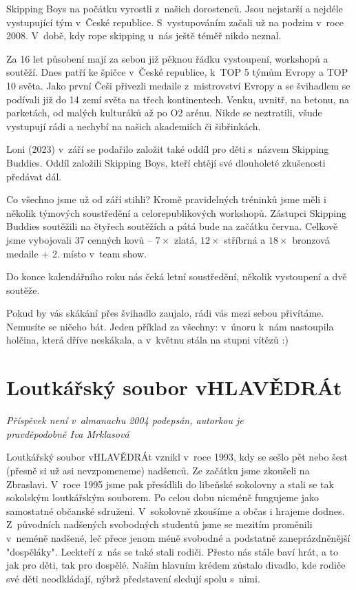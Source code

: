\documentclass[a5paper, 11pt, twoside]{article}
\begin{document}
\noindent
Skipping Boys na počátku vyrostli z~našich dorostenců. Jsou nejstarší a
nejdéle vystupující tým v~České republice. S~vystupováním začali už na
podzim v~roce 2008. V~době, kdy rope skipping u~nás ještě téměř nikdo
neznal.

Za 16 let působení mají za sebou již pěknou řádku vystoupení, workshopů
a soutěží. Dnes patří ke špičce v~České republice, k~TOP 5 týmům Evropy
a TOP 10 světa. Jako první Češi přivezli medaile z~mistrovství Evropy a
se švihadlem se podívali již do 14 zemí světa na třech kontinentech.
Venku, uvnitř, na betonu, na parketách, od malých kulturáků až po O2
arénu. Nikde se neztratili, všude vystupují rádi a nechybí na našich
akademiích či šibřinkách.

Loni (2023) v~září se podařilo založit také oddíl pro děti s~názvem
Skipping Buddies. Oddíl založili Skipping Boys, kteří chtějí své
dlouholeté zkušenosti předávat dál.

Co všechno jsme už od září stihli? Kromě pravidelných tréninků jsme měli
i několik týmových soustředění a celorepublikových workshopů. Zástupci
Skipping Buddies soutěžili na čtyřech soutěžích a pátá bude na začátku
června. Celkově jsme vybojovali 37 cenných kovů -- \(7\times\) zlatá, \(12\times\)
stříbrná a \(18\times\) bronzová medaile + 2. místo v~team show.

Do konce kalendářního roku nás čeká letní soustředění, několik
vystoupení a dvě soutěže.

Pokud by vás skákání přes švihadlo zaujalo, rádi vás mezi sebou
přivítáme. Nemusíte se ničeho bát. Jeden příklad za všechny: v~únoru
k~nám nastoupila holčina, která dříve neskákala, a v~květnu stála na
stupni vítězů :)

\section{Loutkářský soubor vHLAVĚDRÁt}

\begin{center}
  \textit{Příspěvek není v~almanachu 2004 podepsán, autorkou je\\pravděpodobně Iva Mrklasová}
\end{center}

\noindent
Loutkářský soubor vHLAVĚDRÁt vznikl v~roce 1993, kdy se sešlo pět nebo
šest (přesně si už asi nevzpomeneme) nadšenců. Ze začátku jsme zkoušeli
na Zbraslavi. V~roce 1995 jsme pak přesídlili do libeňské sokolovny a
stali se tak sokolským loutkářským souborem. Po celou dobu nicméně
fungujeme jako samostatné občanské sdružení. V~sokolovně zkoušíme a
občas i hrajeme dodnes. Z~původních nadšených svobodných studentů jsme
se mezitím proměnili v~neméně nadšené, leč přece jenom méně svobodné a
podstatně zaneprázdněnější "dospěláky". Leckteří z~nás se také stali
rodiči. Přesto nás stále baví hrát, a to jak pro děti, tak pro dospělé.
Naším hlavním krédem zůstalo divadlo, kde rodiče své děti neodkládají,
nýbrž představení sledují spolu s~nimi.
\end{document}
